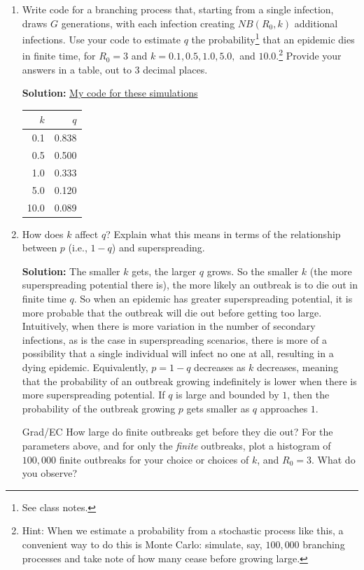 \documentclass[11pt]{article}
\newenvironment{solution}{\par\noindent\begingroup\color{Blue}\textbf{Solution:} }{\par\endgroup}
\begin{document}
\begin{enumerate}
\begin{enumerate}[label=\alph*.]
	\item Write code for a branching process that, starting from a single infection, draws $G$ generations, with each infection creating $NB(R_0,k)$ additional infections. Use your code to estimate $q$ the probability\footnote{See class notes.} that an epidemic dies in finite time, for $R_0=3$ and $k=0.1, 0.5, 1.0, 5.0,$ and $10.0$.\footnote{Hint: When we estimate a probability from a stochastic process like this, a convenient way to do this is Monte Carlo: simulate, say, $100,000$ branching processes and take note of how many cease before growing large.} Provide your answers in a table, out to 3 decimal places.
		\begin{solution}
			\href{https://github.com/JasonHunter95/infectious-diseases/blob/main/HW3/homework_3.ipynb} {My code for these simulations}
			\begin{center}
				\begin{tabular}{r|r}
				$k$ & $q$ \\
				\hline
				0.1 & 0.838 \\
				0.5 & 0.500 \\
				1.0 & 0.333 \\
				5.0 & 0.120 \\
				10.0 & 0.089 \\
				\end{tabular}
			\end{center}
		\end{solution}
	\item How does $k$ affect $q$? Explain what this means in terms of the relationship between $p$ (i.e., $1-q$) and superspreading. 
		\begin{solution}
			The smaller $k$ gets, the larger $q$ grows. So the smaller $k$ (the more superspreading potential there is), the more likely an outbreak is to die out in finite time $q$. 
			So when an epidemic has greater superspreading potential, it is more probable that the outbreak will die out before getting too large. Intuitively, when there is more variation in the number of secondary infections, as is the case in superspreading scenarios, there is more of a possibility that a single individual will infect no one at all, resulting in a dying epidemic.
			Equivalently, $p = 1 - q$ decreases as $k$ decreases, meaning that the probability of an outbreak growing indefinitely is lower when there is more superspreading potential.
			If $q$ is large and bounded by $1$, then the probability of the outbreak growing $p$ gets smaller as $q$ approaches $1$.
		\end{solution}
	\item [Grad/EC] How large do finite outbreaks get before they die out? For the parameters above, and for only the {\it finite} outbreaks, plot a histogram of $100,000$ finite outbreaks for your choice or choices of $k$, and $R_0=3$. What do you observe? 
\end{enumerate}


\end{enumerate}
\end{document}
